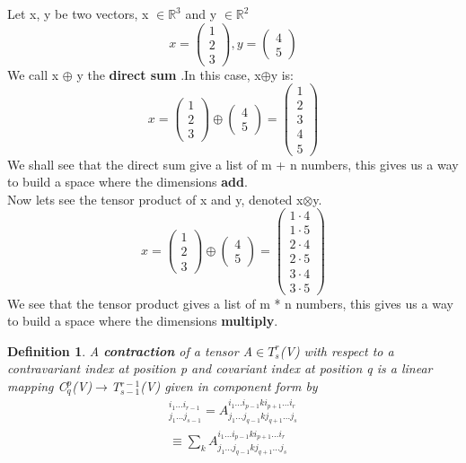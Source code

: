 \documentclass[12pt,a4paper]{article}
\newtheorem{defn}[thm]{Definition}
\begin{document}
Let x, y be two vectors, x $\in\mathbb{R}^3$ and y $\in\mathbb{R}^2$
\[x = 
\begin{pmatrix}
1\\2\\3
\end{pmatrix}
,y = 
\begin{pmatrix}
4\\5
\end{pmatrix}
\]
We call x $\oplus$ y the \textbf{direct sum} .In this case, x$\oplus$y is:
\[x = 
\begin{pmatrix}
1\\2\\3
\end{pmatrix}
\oplus
\begin{pmatrix}
4\\5
\end{pmatrix}
=\begin{pmatrix}
1\\2\\3\\4\\5
\end{pmatrix}
\]
We shall see that the direct sum give a list of m + n numbers, this gives us a way to build a space where the dimensions \textbf{add}.\\
Now lets see the tensor product of x and y, denoted x$\otimes$y.
\[x = 
\begin{pmatrix}
1\\2\\3
\end{pmatrix}
\oplus
\begin{pmatrix}
4\\5
\end{pmatrix}
=\begin{pmatrix}
1 \cdot 4 \\ 1 \cdot 5\\2 \cdot 4\\2 \cdot 5\\3 \cdot 4\\3 \cdot 5
\end{pmatrix}
\]
We see that the tensor product gives a list of m * n numbers, this gives us a way to build a space where the dimensions \textbf{multiply}.
\begin{defn}
A \textbf{contraction} of a tensor A$\in T^r_s$(V) with respect to a contravariant index at position p and covariant index at position q is a linear mapping C$^p_q$(V)$\to$T$^{r-1}_{s-1}$(V) given in \textit{component form} by\begin{eqnarray*}
	[C^p_q(A)]^{i_1...i_{r-1}}_{j_1...j_{s-1}} = A ^{i_1...i_{p-1}ki_{p+1}...i_r}_{j_1...j_{q-1}kj_{q+1}...j_s} \\ \equiv \sum_{k}A ^{i_1...i_{p-1}ki_{p+1}...i_r}_{j_1...j_{q-1}kj_{q+1}...j_s}
\end{eqnarray*}
\end{defn}
\end{document}
